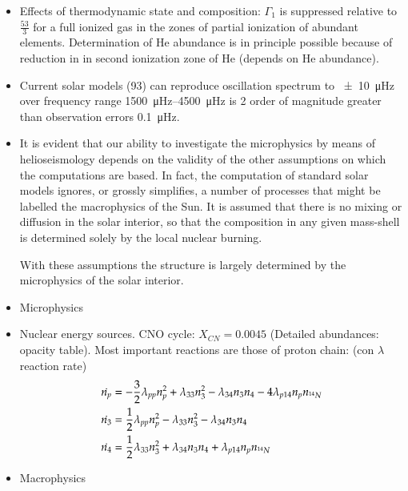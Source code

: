 \documentclass[oneside,12pt,fleqn]{memoir}
\begin{document}
{\begin{itemize}
\item Effects of thermodynamic state and composition: $\Gamma_1$ is suppressed relative to $\frac{53}{3}$ for a full ionized gas in the zones of partial ionization of abundant elements. Determination of He abundance is in principle possible because of reduction in \gexp{} in second ionization zone of He (depends on He abundance).
\item Current solar models (93) can reproduce oscillation spectrum to \SI{+-10}{\micro\hertz} over frequency range \SIrange{1500}{4500}{\micro\hertz} is 2 order of magnitude greater than observation errors \SI{0.1}{\micro\hertz}.
\item It is evident that our ability to investigate the microphysics by means of helioseismology depends on the validity of the other assumptions on which the computations are based. In fact, the computation of standard solar models ignores, or grossly simplifies, a number of processes that might be labelled the macrophysics of the Sun.
It is assumed that there is no mixing or diffusion in the solar interior, so that the composition in any given mass-shell is determined solely by the local nuclear burning. 

With these assumptions the structure is largely determined by the microphysics of the solar interior.

\item Microphysics

\item Nuclear energy sources.
CNO cycle: $X_{CN}=0.0045$ (Detailed abundances: opacity table).
Most important reactions are those of proton chain: (con $\lambda$ reaction rate)
\begin{align*}
&\dot{n_p}=-\frac{3}{2}\lambda_{pp}n_p^2+\lambda_{33}n_3^2-\lambda_{34}n_3n_4-4\lambda_{p14}n_pn_{\indices{^{14}}N}\\
&\dot{n_3}=\frac{1}{2}\lambda_{pp}n_p^2-\lambda_{33}n_3^2-\lambda_{34}n_3n_4\\
&\dot{n_4}=\frac{1}{2}\lambda_{33}n_3^2+\lambda_{34}n_3n_4+\lambda_{p14}n_pn_{\indices{^{14}}N}
\end{align*}


\item Macrophysics



\end{itemize}}
\end{document}
